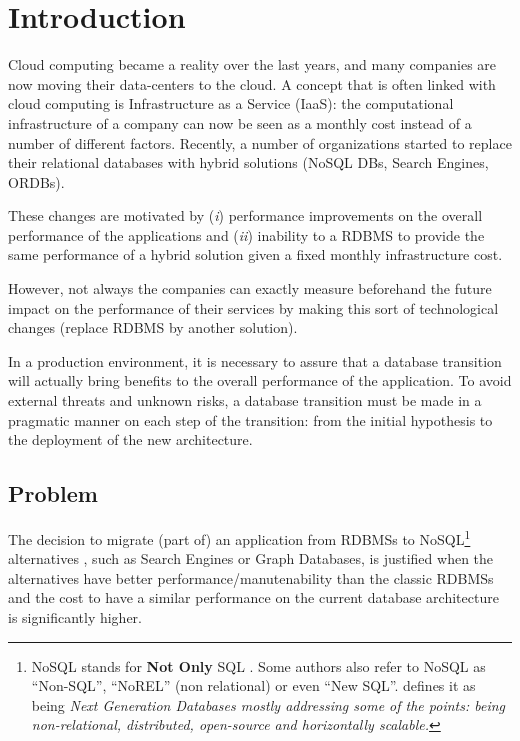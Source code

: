 \chapter{Introduction}\label{introductionChap}

Cloud computing became a reality over the last years, and many companies are now moving their data-centers to the cloud. 
A concept that is often linked with cloud computing is Infrastructure as a Service (IaaS): the computational infrastructure of a company can now be seen as a monthly cost instead of a number of different factors. 
Recently, a number of organizations started to replace their relational databases with hybrid solutions (NoSQL DBs, Search Engines, ORDBs). 

These changes are motivated by (\textit{i}) performance improvements on the overall performance of the applications and (\textit{ii}) inability to a RDBMS to provide the same performance of a hybrid solution given a fixed monthly infrastructure cost.

However, not always the companies can exactly measure beforehand the future impact on the performance of their services by making this sort of technological changes (replace RDBMS by another solution).

In a production environment, it is necessary to assure that a database transition will actually bring benefits to the overall performance of the application. To avoid external threats and unknown risks, a database transition must be made in a pragmatic manner on each step of the transition: from the initial hypothesis to the deployment of the new architecture.


\section{Problem}

The decision to migrate (part of) an application from RDBMSs to NoSQL\footnote{ NoSQL stands for  \textbf{Not Only} SQL \cite{7023585}. Some authors also refer to NoSQL as ``Non-SQL'', ``NoREL'' (non relational) or even ``New SQL''. \cite{NOSQLDB} defines it as being \textit{
Next Generation Databases mostly addressing some of the points: being non-relational, distributed, open-source and horizontally scalable.}} alternatives , such as Search Engines or Graph Databases, is justified when the alternatives have better performance/manutenability than the classic RDBMSs and the cost to have a similar performance on the current database architecture is significantly higher. 

